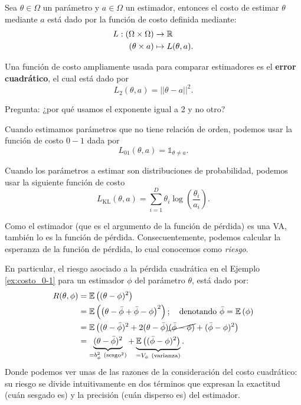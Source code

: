 \begin{definition}
Sea $\theta\in\Omega$ un parámetro y $a\in\Omega$ un estimador, entonces el costo de estimar $\theta$ mediante $a$ está dado por la función de costo definida mediante:
\begin{align}
    L: (\Omega \times \Omega) &\rightarrow {\mathbb R}\\
    (\theta \times a) &\mapsto L(\theta,a).
\end{align}

\end{definition}

\begin{example}
	\label{ex:costo_cuadrático}
Una función de costo ampliamente usada para comparar estimadores es el \textbf{error cuadrático}, el cual
está dado por  
$$
L_2(\theta,a) = ||\theta-a||^{2}.
$$
\end{example}
Pregunta: ¿por qué usamos el exponente igual a 2 y no otro?

\begin{example}
	\label{ex:costo_0-1}
Cuando estimamos parámetros que no tiene relación de orden, podemos usar la función de costo $0-1$ dada por
$$
L_{01}(\theta,a) = \mathbb{1}_{\theta\neq a}.
$$
\end{example}

\begin{example}
	\label{ex:costo_KL}
Cuando los parámetros a estimar son distribuciones de probabilidad, podemos usar la siguiente función de costo
$$
L_{\text{KL}}(\theta,a) = \sum_{i=1}^D\theta_i \log\left(\frac{\theta_i}{a_i}\right).
$$
\end{example}

	
Como el estimador (que es el argumento de la función de pérdida) es una VA, también lo es la función de pérdida.  Consecuentemente, podemos calcular la esperanza de la función de pérdida, lo cual conocemos como \textit{riesgo}. 

En particular, el riesgo asociado a la pérdida cuadrática en el Ejemplo \ref{ex:costo_0-1} para un estimador $\phi$ del parámetro $\theta$, está dado por: 
\begin{alignat}{3}
 	R(\theta, \phi)  &= \E{(\theta - \phi)^2}\nonumber\\
 						& = \E{\left(\theta - \bar{\phi}+ \bar{\phi} -\phi\right)^2}; \quad \text{denotando }\bar{\phi} = \E{ \phi}\nonumber\\
 						& = \E{(\theta - \bar{\phi})^2+2(\theta - \bar{\phi})\cancel{(\bar{\phi} -\phi)} +  (\bar{\phi} -\phi)^2}\nonumber\\
 						& = \underbrace{(\theta - \bar{\phi})^2}_{=b_{\phi}^2\ (\text{sesgo}^2)} +  \underbrace{\E{(\bar{\phi} -\phi)^2}}_{=V_{\phi}\ \text{(varianza)}}.\label{eq:riesgo_cuad}
 \end{alignat} 
 Donde podemos ver unas de las razones de la consideración del costo cuadrático: su riesgo se divide intuitivamente en dos términos que expresan la exactitud (cuán sesgado es) y la precisión (cuán disperso es) del estimador.

